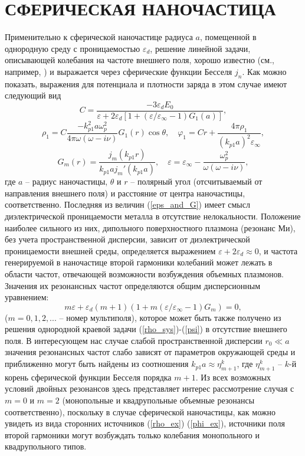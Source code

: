 \documentclass[12pt, a4paper]{article}
\def \eps {\varepsilon}
\def \w {\omega}
\def \ph {\varphi}
\begin{document}
\section{СФЕРИЧЕСКАЯ НАНОЧАСТИЦА}
Применительно к сферической наночастице радиуса $a$, помещенной в однородную среду с проницаемостью $\eps_d$, решение линейной задачи, описывающей колебания на частоте внешнего поля, хорошо известно (см., например, \cite{HuaGersten1986}) и выражается через сферические функции Бесселя $j_n$. Как можно показать, выражения для потенциала и плотности заряда в этом случае имеют следующий вид
\begin{equation} 
	C= \frac{-3\eps_d E_0}{\eps + 2\eps_d [1 + (\eps/\eps_\infty - 1) G_1(a) ]},  
\end{equation}
\begin{equation} 
	\label{rho_and_phi}
	\rho_1 = C \frac{-k_{p1}^2a\w_p^2}{4\pi\w(\w - i \nu) } G_1(r)\cos\theta, \quad \ph_1 = C r + \frac{4\pi \rho_1 }{(k_{p1}a)^2 \eps_\infty},
\end{equation}
\begin{equation}\label{eps_and_G}
		 G_m(r) =\frac{j_m(k_{p1}r)}{k_{p1}a j_m'(k_{p1}a)},\quad
	\eps = \eps_\infty - \frac{\w_p^2}{\w(\w - i\nu)},
\end{equation}
где $a$ -- радиус наночастицы, $\theta$ и $r$  -- полярный угол (отсчитываемый от направления внешнего поля) и расстояние от центра наночастицы, соответственно. Последняя из величин (\ref{eps_and_G}) имеет смысл диэлектрической проницаемости металла в отсутствие нелокальности. 
Положение наиболее сильного из них, дипольного поверхностного плазмона (резонанс Ми), без учета пространственной дисперсии, зависит от диэлектрической проницаемости внешней среды, определяется выражением $ \eps + 2\eps_d \approx 0$, и частота генерируемой в наночастице второй гармоники колебаний может лежать в области частот, отвечающей возможности возбуждения объемных плазмонов. Значения их резонансных частот определяются общим дисперсионным уравнением:
\begin{equation} 	
m \eps + \eps_d(m+1)(1 + m (\eps/\eps_\infty - 1) G_m) = 0,	
\end{equation}
($m=0,1,2,...$ – номер мультиполя), которое может быть также получено из решения однородной краевой задачи (\ref{rho_sys})-(\ref{psi}) в отсутствие внешнего поля. В интересующем нас случае слабой пространственной дисперсии $r_0 \ll a$ значения резонансных частот слабо зависят от параметров окружающей среды и приближенно могут быть найдены из соотношения $ k_{p1} a \approx \eta_{m+1}^k$, где $\eta_{m+1}^k$ -- $k$-й корень сферической функции Бесселя порядка $m+1$.	Из всех возможных условий двойных резонансов здесь представляет интерес рассмотрение случая с $m=0$ и $m=2$ (монопольные и квадрупольные объемные резонансы соответственно), поскольку в случае сферической наночастицы, как можно увидеть из вида сторонних источников (\ref{rho_ex}) (\ref{phi_ex}), источники поля второй гармоники могут возбуждать только колебания монопольного и квадрупольного типов. 
\end{document}
